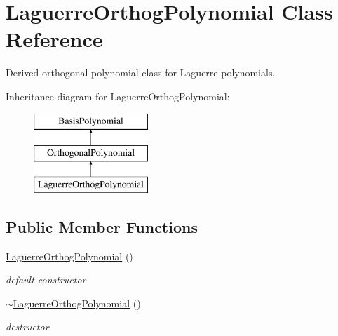 \section{Laguerre\+Orthog\+Polynomial Class Reference}
\label{classPecos_1_1LaguerreOrthogPolynomial}


Derived orthogonal polynomial class for Laguerre polynomials.  


Inheritance diagram for Laguerre\+Orthog\+Polynomial\+:\begin{figure}[H]
\begin{center}
\leavevmode
\includegraphics[height=3.000000cm]{classPecos_1_1LaguerreOrthogPolynomial}
\end{center}
\end{figure}
\subsection*{Public Member Functions}
\begin{DoxyCompactItemize}
\item 
\hyperlink{classPecos_1_1LaguerreOrthogPolynomial_ab645e46ecb3df444b3af57a8134fd432}{Laguerre\+Orthog\+Polynomial} ()\label{classPecos_1_1LaguerreOrthogPolynomial_ab645e46ecb3df444b3af57a8134fd432}

\begin{DoxyCompactList}\small\item\em default constructor \end{DoxyCompactList}\item 
\hyperlink{classPecos_1_1LaguerreOrthogPolynomial_a820bc540039324044c8592f173d45dc4}{$\sim$\+Laguerre\+Orthog\+Polynomial} ()\label{classPecos_1_1LaguerreOrthogPolynomial_a820bc540039324044c8592f173d45dc4}

\begin{DoxyCompactList}\small\item\em destructor \end{DoxyCompactList}\end{DoxyCompactItemize}
